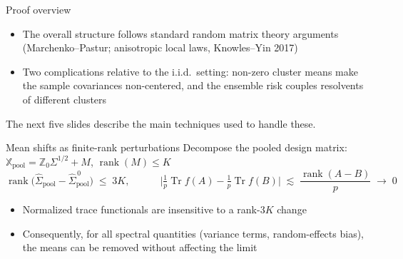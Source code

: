 \documentclass[aspectratio=169,11pt]{beamer}
\newcommand{\E}{\mathbb{E}}
\newcommand{\Tr}{\operatorname{Tr}}
\newcommand{\bbeta}{\bm{\beta}}
\newcommand{\X}{\mathbb{X}}
\begin{document}
\begin{frame}{Proof overview}
  \begin{center}
  \end{center}
  \vspace{2mm}
  \begin{itemize}
    \item The overall structure follows standard random matrix theory arguments (Marchenko--Pastur; anisotropic local laws, Knowles--Yin 2017)
    \item Two complications relative to the i.i.d.\ setting: non-zero cluster means make the sample covariances non-centered, and the ensemble risk couples resolvents of different clusters
  \end{itemize}
  \vspace{1mm}
  The next five slides describe the main techniques used to handle these.
\end{frame}

\begin{frame}{Mean shifts as finite-rank perturbations}
  Decompose the pooled design matrix: \quad $\X_{\mathrm{pool}} = \mathbb{Z}_0\Sigma^{1/2} + M$, \qquad $\operatorname{rank}(M) \le K$
  \[
    \operatorname{rank}\big(\widehat\Sigma_{\mathrm{pool}} - \widehat\Sigma^{\,0}_{\mathrm{pool}}\big) \;\le\; 3K,
    \qquad\quad
    \Big|\tfrac1p\Tr f(A) - \tfrac1p\Tr f(B)\Big| \;\lesssim\; \frac{\operatorname{rank}(A-B)}{p} \;\to\; 0
  \]
  \vspace{1mm}
  \begin{itemize}
    \item Normalized trace functionals are insensitive to a rank-$3K$ change
    \item Consequently, for all spectral quantities (variance terms, random-effects bias), the means can be removed without affecting the limit
  \end{itemize}
\end{frame}
\end{document}
